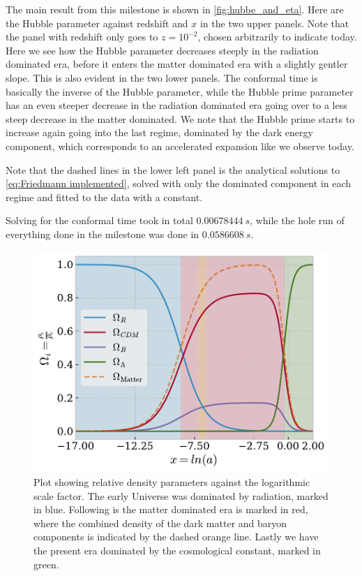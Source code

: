 \documentclass[10pt,a4paper]{article}
\begin{document}
The main result from this milestone is shown in \cref{fig:hubbe_and_eta}. Here are the Hubble parameter against redshift and $x$ in the two upper panels. Note that the panel with redshift only goes to $z=10^{-2}$, chosen arbitrarily to indicate today. Here we see how the Hubble parameter decreases steeply in the radiation dominated era, before it enters the matter dominated era with a slightly gentler slope. This is also evident in the two lower panels. The conformal time is basically the inverse of the Hubble parameter, while the Hubble prime parameter has an even steeper decrease in the radiation dominated era going over to a less steep decrease in the matter dominated. We note that the Hubble prime starts to increase again going into the last regime, dominated by the dark energy component, which corresponds to an accelerated expansion like we observe today.

Note that the dashed lines in the lower left panel is the analytical solutions to \cref{eq:Friedmann implemented}, solved with only the dominated component in each regime and fitted to the data with a constant.

Solving for the conformal time took in total $\SI{0.00678444}{s}$, while the hole run of everything done in the milestone was done in $\SI{0.0586608}{s}$.

\begin{figure}[t]
    \centering
    \includegraphics[scale=0.5]{../figs/omegas_of_x.pdf}
    \caption{Plot showing relative density parameters against the logarithmic scale factor. The early Universe was dominated by radiation, marked in blue. Following is the matter dominated era is marked in red, where the combined density of the dark matter and baryon components is indicated by the dashed orange line. Lastly we have the present era dominated by the cosmological constant, marked in green.}
    \label{fig:omegas_of_x}
\end{figure}
\end{document}
